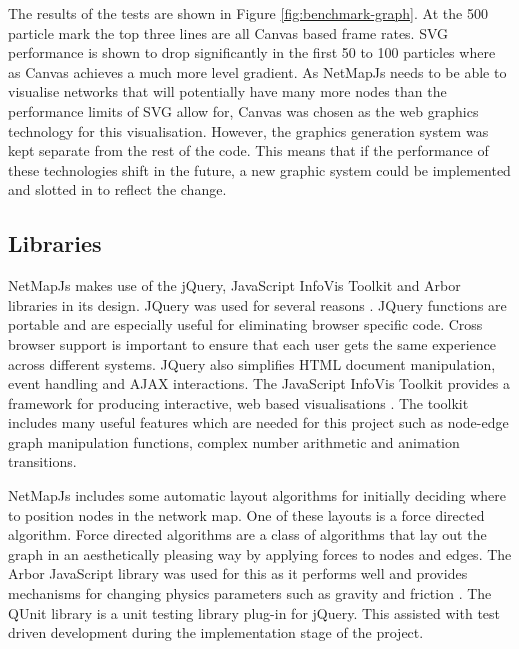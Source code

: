 \documentclass[11pt, a4paper]{article}
\begin{document}
The results of the tests are shown in Figure \ref{fig:benchmark-graph}. At the
500 particle mark the top three lines are all Canvas based frame rates. SVG
performance is shown to drop significantly in the first 50 to 100 particles
where as Canvas achieves a much more level gradient. As NetMapJs needs to be
able to visualise networks that will potentially have many more nodes than the
performance limits of SVG allow for, Canvas was chosen as the web graphics
technology for this visualisation. However, the graphics generation system was
kept separate from the rest of the code. This means that if the performance of
these technologies shift in the future, a new graphic system could be
implemented and slotted in to reflect the change.


\subsection{Libraries}
\label{sec:libraries}

NetMapJs makes use of the jQuery, JavaScript InfoVis Toolkit and Arbor libraries
in its design. JQuery was used for several reasons \cite{jQuery_website}. JQuery
functions are portable and are especially useful for eliminating browser
specific code. Cross browser support is important to ensure that each user gets
the same experience across different systems. JQuery also simplifies HTML
document manipulation, event handling and AJAX interactions. The JavaScript
InfoVis Toolkit provides a framework for producing interactive, web based
visualisations \cite{thejit_website}. The toolkit includes many useful features
which are needed for this project such as node-edge graph manipulation
functions, complex number arithmetic and animation transitions.

NetMapJs includes some automatic layout algorithms for initially deciding where
to position nodes in the network map. One of these layouts is a force directed
algorithm. Force directed algorithms are a class of algorithms that lay out the
graph in an aesthetically pleasing way by applying forces to nodes and edges.
The Arbor JavaScript library was used for this as it performs well and provides
mechanisms for changing physics parameters such as gravity and friction
\cite{Arbor_website}. The QUnit library is a unit testing library plug-in for
jQuery. This assisted with test driven development during the implementation
stage of the project.
\end{document}
